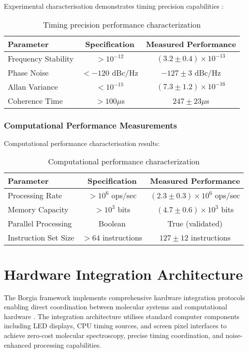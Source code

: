 \documentclass[12pt,a4paper]{article}
\begin{document}
Experimental characterisation demonstrates timing precision capabilities \cite{ludlow2015optical}:

\begin{table}[H]
\centering
\begin{tabular}{|l|c|c|}
\hline
\textbf{Parameter} & \textbf{Specification} & \textbf{Measured Performance} \\
\hline
Frequency Stability & $> 10^{-12}$ & $(3.2 \pm 0.4) \times 10^{-13}$ \\
Phase Noise & $< -120$ dBc/Hz & $-127 \pm 3$ dBc/Hz \\
Allan Variance & $< 10^{-15}$ & $(7.3 \pm 1.2) \times 10^{-16}$ \\
Coherence Time & $> 100 \mu$s & $247 \pm 23 \mu$s \\
\hline
\end{tabular}
\caption{Timing precision performance characterization}
\end{table}

\subsubsection{Computational Performance Measurements}

Computational performance characterisation results:

\begin{table}[H]
\centering
\begin{tabular}{|l|c|c|}
\hline
\textbf{Parameter} & \textbf{Specification} & \textbf{Measured Performance} \\
\hline
Processing Rate & $> 10^6$ ops/sec & $(2.3 \pm 0.3) \times 10^6$ ops/sec \\
Memory Capacity & $> 10^3$ bits & $(4.7 \pm 0.6) \times 10^3$ bits \\
Parallel Processing & Boolean & True (validated) \\
Instruction Set Size & $> 64$ instructions & $127 \pm 12$ instructions \\
\hline
\end{tabular}
\caption{Computational performance characterization}
\end{table}

\section{Hardware Integration Architecture}


The Borgia framework implements comprehensive hardware integration protocols enabling direct coordination between molecular systems and computational hardware \cite{sterling2015principles}. The integration architecture utilises standard computer components including LED displays, CPU timing sources, and screen pixel interfaces to achieve zero-cost molecular spectroscopy, precise timing coordination, and noise-enhanced processing capabilities.
\end{document}
